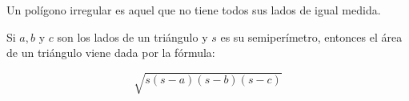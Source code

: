 \begin{definition}
    Un polígono irregular es aquel que no tiene todos sus lados de igual medida.
\end{definition}

\begin{theorem}

Si $a,b$ y $c$ son los lados de un triángulo y $s$ es su semiperímetro, entonces el área de un triángulo viene dada por la fórmula:

$$\sqrt{s(s-a)(s-b)(s-c)}$$
    
\end{theorem}